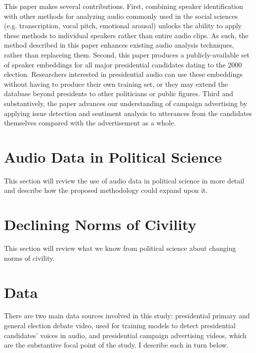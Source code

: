 \documentclass[12pt]{article}
\begin{document}

This paper makes several contributions. First, combining speaker identification with other methods for analyzing audio commonly used in the social sciences (e.g. transcription, vocal pitch, emotional arousal) unlocks the ability to apply these methods to individual speakers rather than entire audio clips. As such, the method described in this paper enhances existing audio analysis techniques, rather than replaceing them. Second, this paper produces a publicly-available set of speaker embeddings for all major presidential candidates dating to the 2000 election. Researchers interested in presidential audio can use these embeddings without having to produce their own training set, or they may extend the database beyond presidents to other politicians or public figures. Third and substantively, the paper advances our understanding of campaign advertising by applying issue detection and sentiment analysis to utterances from the candidates themselves compared with the advertisement as a whole.

\section{Audio Data in Political Science}
This section will review the use of audio data in political science in more detail and describe how the proposed methodology could expand upon it.

\section{Declining Norms of Civility}
This section will review what we know from political science about changing norms of civility.

\section{Data}
There are two main data sources involved in this study: presidential primary and general election debate video, used for training models to detect presidential candidates' voices in audio, and presidential campaign advertising videos, which are the substantive focal point of the study. I describe each in turn below.
\end{document}
